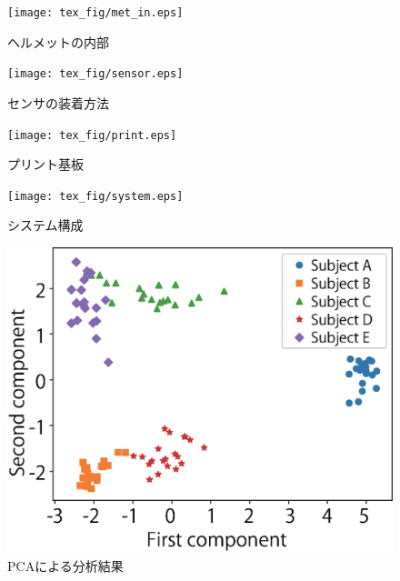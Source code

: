 \documentclass[a4j]{jarticle}%
\begin{document}
\begin{figure}[!t]
  \begin{center}
    \texttt{[image: tex\_fig/met\_in.eps]}
  \end{center}
    \vspace{-8mm}
  \caption{ヘルメットの内部}
  \label{met_in}
\end{figure}

\begin{figure}[!t]
  \begin{center}
    \texttt{[image: tex\_fig/sensor.eps]}
  \end{center}
    \vspace{-8mm}
  \caption{センサの装着方法}
  \label{sensor}
\end{figure}

\begin{figure}[!t]
  \begin{center}
    \texttt{[image: tex\_fig/print.eps]}
  \end{center}
    \vspace{-8mm}
  \caption{プリント基板}
  \label{print}
\end{figure}

\begin{figure}[!t]
  \begin{center}
    \texttt{[image: tex\_fig/system.eps]}
  \end{center}
    \vspace{-8mm}
  \caption{システム構成}
  \label{system}
\end{figure}

\begin{figure}[!t]
  \begin{center}
    \includegraphics[width=1\linewidth]{PCA.eps}
  \end{center}
    \vspace{-8mm}
  \caption{PCAによる分析結果}
  \label{pca}
\end{figure}



\end{document}
